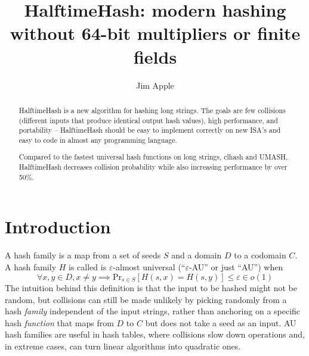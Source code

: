 \documentclass[runningheads]{llncs}
\begin{document}
\title{HalftimeHash: modern hashing without 64-bit multipliers or finite fields}
\author{Jim Apple
}


\maketitle


\begin{abstract}
HalftimeHash is a new algorithm for hashing long strings.
The goals are few collisions (different inputs that produce identical output hash values), high performance, and portability -- HalftimeHash should be easy to implement correctly on new ISA's and easy to code in almost any programming language.

Compared to the fastest universal hash functions on long strings, clhash and UMASH, HalftimeHash decreases collision probability while also increasing performance by over 50\%.

\end{abstract}

\section{Introduction}
A hash family is a map from a set of seeds $S$ and a domain $D$ to a codomain $C$.
A hash family $H$ is called is $\varepsilon$-almost universal (``$\varepsilon$-AU'' or just ``AU'') when
\[
\forall x,y \in D, x \neq y \implies \mathrm{Pr}_{s \in S}[H(s, x) = H(s, y)] \leq \varepsilon \in o(1)
\]
The intuition behind this definition is that the input to be hashed might not be random, but collisions can still be made unlikely by picking randomly from a hash {\em family} independent of the input strings, rather than anchoring on a specific hash {\em function} that maps from $D$ to $C$ but does not take a seed as an input. AU hash families are useful in hash tables, where collisions slow down operations and, in extreme cases, can turn linear algorithms into quadratic ones. \cite{tabulation,rust-quadratic,impala-quadratic,algorithm-attack}
\end{document}
